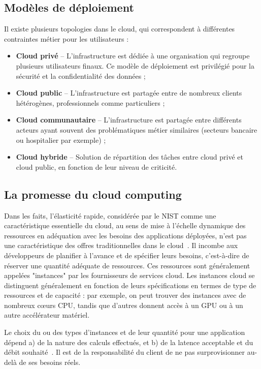 \subsection{Modèles de déploiement}

Il existe plusieurs topologies dans le cloud, qui correspondent à différentes contraintes métier pour les utilisateurs :

\begin{itemize}
    \item \textbf{Cloud privé} -- L'infrastructure est dédiée à une organisation qui regroupe plusieurs utilisateurs finaux. Ce modèle de déploiement est privilégié pour la sécurité et la confidentialité des données ;
    \item \textbf{Cloud public} -- L'infrastructure est partagée entre de nombreux clients hétérogènes, professionnels comme particuliers ;
    \item \textbf{Cloud communautaire} -- L'infrastructure est partagée entre différents acteurs ayant souvent des problématiques métier similaires (secteurs bancaire ou hospitalier par exemple) ;
    \item \textbf{Cloud hybride} -- Solution de répartition des tâches entre cloud privé et cloud public, en fonction de leur niveau de criticité.
\end{itemize}

\subsection{La promesse du cloud computing}

Dans les faits, l'élasticité rapide, considérée par le NIST comme une caractéristique essentielle du cloud, au sens de mise à l'échelle dynamique des ressources en adéquation avec les besoins des applications déployées, n'est pas une caractéristique des offres traditionnelles dans le cloud~\cite{herbstElasticityCloudComputing}. Il incombe aux développeurs de planifier à l'avance et de spécifier leurs besoins, c'est-à-dire de réserver une quantité adéquate de ressources. Ces ressources sont généralement appelées "instances" par les fournisseurs de services cloud. Les instances cloud se distinguent généralement en fonction de leurs spécifications en termes de type de ressources et de capacité : par exemple, on peut trouver des instances avec de nombreux cœurs CPU, tandis que d'autres donnent accès à un GPU ou à un autre accélérateur matériel.

Le choix du ou des types d'instances et de leur quantité pour une application dépend a) de la nature des calculs effectués, et b) de la latence acceptable et du débit souhaité~\cite{yallesRISCLESSReinforcementLearning}. Il est de la responsabilité du client de ne pas surprovisionner au-delà de ses besoins réels.

